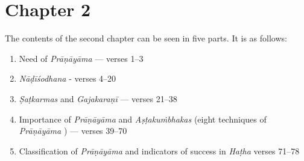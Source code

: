 \section*{Chapter 2}
\vspace{-5pt}
The contents of the second chapter can be seen in five parts. It is as follows:  
\vspace{-5pt}
\begin{enumerate}
\item Need  of \textit{Prāṇāyāma} ---  verses 1--3 
\item \textit{Nāḍīśodhana}  - verses 4--20
\item \textit{Ṣaṭkarmas} and \textit{Gajakaraṇī} --- verses 21--38
\item Importance of \textit{Prāṇāyāma} and \textit{Aṣṭakuṁbhakas} (eight techniques of \textit{Prāṇāyāma} ) --- verses 39--70
\item Classification of \textit{Prāṇāyāma} and indicators of  success in \textit{Haṭha} verses 71--78
\end{enumerate}

